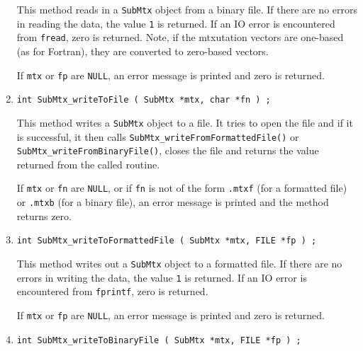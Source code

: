 \begin{enumerate}
\begin{verbatim}
\end{verbatim}
\par
This method reads in a {\tt SubMtx} object from a binary file.
If there are no errors in reading the data, 
the value {\tt 1} is returned.
If an IO error is encountered from {\tt fread}, zero is returned.
Note, if the mtxutation vectors are one-based (as for Fortran),
they are converted to zero-based vectors.
\par {}
If {\tt mtx} or {\tt fp} are {\tt NULL},
an error message is printed and zero is returned.
\item
\begin{verbatim}
int SubMtx_writeToFile ( SubMtx *mtx, char *fn ) ;
\end{verbatim}
\par
This method writes a {\tt SubMtx} object to a file.
It tries to open the file and if it is successful, 
it then calls {\tt SubMtx\_writeFromFormattedFile()} or
{\tt SubMtx\_writeFromBinaryFile()},
closes the file
and returns the value returned from the called routine.
\par {}
If {\tt mtx} or {\tt fn} are {\tt NULL}, 
or if {\tt fn} is not of the form
{\tt *.mtxf} (for a formatted file) 
or {\tt *.mtxb} (for a binary file),
an error message is printed and the method returns zero.
\item
\begin{verbatim}
int SubMtx_writeToFormattedFile ( SubMtx *mtx, FILE *fp ) ;
\end{verbatim}
\par
This method writes out a {\tt SubMtx} object to a formatted file.
If there are no errors in writing the data, 
the value {\tt 1} is returned.
If an IO error is encountered from {\tt fprintf}, zero is returned.
\par {}
If {\tt mtx} or {\tt fp} are {\tt NULL},
an error message is printed and zero is returned.
\item
\begin{verbatim}
int SubMtx_writeToBinaryFile ( SubMtx *mtx, FILE *fp ) ;

\end{verbatim}
\end{enumerate}
